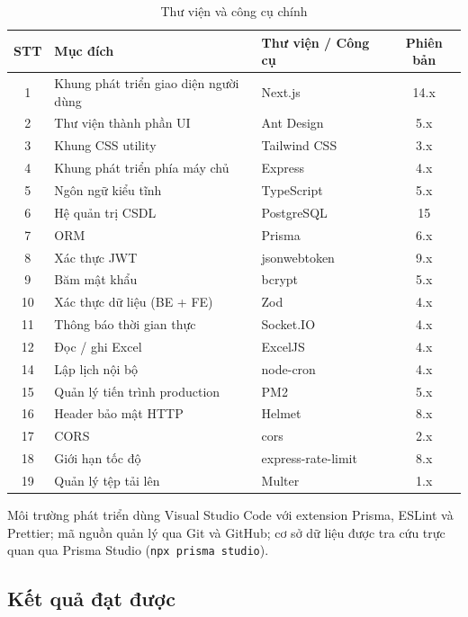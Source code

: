 \documentclass[../DoAn.tex]{subfiles}
\begin{document}
\begin{table}[H]
\centering
\caption{Thư viện và công cụ chính}
\label{tab:thuvien}
\begin{tabular}{|c|p{6cm}|p{4.5cm}|c|}
\hline
\textbf{STT} & \textbf{Mục đích} & \textbf{Thư viện / Công cụ} & \textbf{Phiên bản} \\ \hline
1 & Khung phát triển giao diện người dùng & Next.js & 14.x \\ \hline
2 & Thư viện thành phần UI & Ant Design & 5.x \\ \hline
3 & Khung CSS utility & Tailwind CSS & 3.x \\ \hline
4 & Khung phát triển phía máy chủ & Express & 4.x \\ \hline
5 & Ngôn ngữ kiểu tĩnh & TypeScript & 5.x \\ \hline
6 & Hệ quản trị CSDL & PostgreSQL & 15 \\ \hline
7 & ORM & Prisma & 6.x \\ \hline
8 & Xác thực JWT & jsonwebtoken & 9.x \\ \hline
9 & Băm mật khẩu & bcrypt & 5.x \\ \hline
10 & Xác thực dữ liệu (BE + FE) & Zod & 4.x \\ \hline
11 & Thông báo thời gian thực & Socket.IO & 4.x \\ \hline
12 & Đọc / ghi Excel & ExcelJS & 4.x \\ \hline
14 & Lập lịch nội bộ & node-cron & 4.x \\ \hline
15 & Quản lý tiến trình production & PM2 & 5.x \\ \hline
16 & Header bảo mật HTTP & Helmet & 8.x \\ \hline
17 & CORS & cors & 2.x \\ \hline
18 & Giới hạn tốc độ & express-rate-limit & 8.x \\ \hline
19 & Quản lý tệp tải lên & Multer & 1.x \\ \hline
\end{tabular}
\end{table}

Môi trường phát triển dùng Visual Studio Code với extension Prisma, ESLint và Prettier; mã nguồn quản lý qua Git và GitHub; cơ sở dữ liệu được tra cứu trực quan qua Prisma Studio (\texttt{npx prisma studio}).

\subsection{Kết quả đạt được}
\label{subsection:4.3.2}
\end{document}
